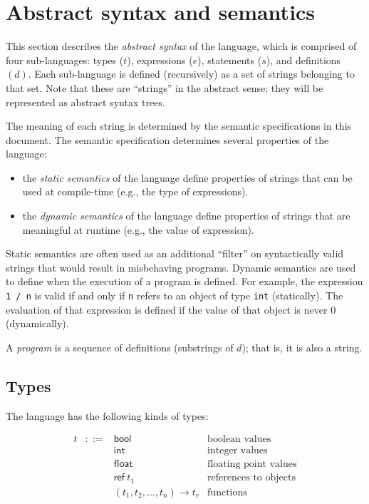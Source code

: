 \documentclass[11pt]{article}
\makeatletter
\newcommand{\code}[1]{\lstinline @#1@}
\newcommand{\mathsc}[1]{\bm{\mathsf{#1}}}
\newcommand{\typebool}{\ensuremath{\mathsc{bool}}\xspace}
\newcommand{\typeint}{\ensuremath{\mathsc{int}}\xspace}
\newcommand{\typefloat}{\ensuremath{\mathsc{float}}\xspace}
\newcommand{\typeref}[1]{\ensuremath{\mathsc{ref}~#1}\xspace}
\newcommand{\typefn}[2]{\ensuremath{(#1)\rightarrow #2}\xspace}
\makeatother
\begin{document}
\section{Abstract syntax and semantics}

This section describes the \emph{abstract syntax} of the language, which is comprised of four sub-languages: types ($t$), expressions ($e$), statements ($s$), and definitions $(d)$.
Each sub-language is defined (recursively) as a set of strings belonging to that set.
Note that these are ``strings'' in the abstract sense; they will be represented as abstract syntax trees.

The meaning of each string is determined by the semantic specifications in this document. 
The semantic specification determines several properties of the language:
\begin{itemize}
\item the \emph{static semantics} of the language define properties of
strings that can be used at compile-time (e.g., the type of expressions).
\item the \emph{dynamic semantics} of the language define properties of
strings that are meaningful at runtime (e.g., the value of expression).
\end{itemize}
Static semantics are often used as an additional ``filter'' on syntactically 
valid strings that would result in misbehaving programs.
Dynamic semantics are used to define when the execution of a program is
defined.
For example, the expression \code{1 / n} is valid if and only if \code{n} refers to an object of type \code{int} (statically). The evaluation of that expression is defined if the value of that object is never 0 (dynamically).

A \emph{program} is a sequence of definitions (substrings of $d$); that is,
it is also a string.

\subsection{Types}

The language has the following kinds of types:

\[
\begin{array}{lcll}
t &::=& \typebool  & \text{boolean values} \\
  &   & \typeint   & \text{integer values} \\
  &   & \typefloat & \text{floating point values} \\
  &   & \typeref{t_1}   & \text{references to objects} \\
  &   & \typefn{t_1, t_2, \ldots, t_n}{t_r}
                  & \text{functions}
\end{array}
\]
\end{document}
